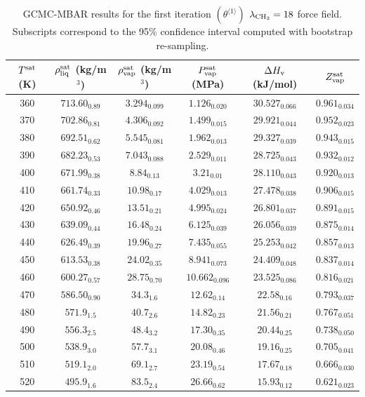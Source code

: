 \documentclass[journal=jctc,manuscript=article]{achemso}
\begin{document}
	\begin{table}[htb!]
		\caption{GCMC-MBAR results for the first iteration $(\theta^{\langle1\rangle})$ $\lambda_{\rm CH_2} = 18$ force field. Subscripts correspond to the 95\% confidence interval computed with bootstrap re-sampling.}
		\begin{center}
			\begin{tabular}{|c|c|c|c|c|c|}
				\hline
				$T^{\rm sat}$ (K) & $\rho_{\rm liq}^{\rm sat}$ (kg/m$^3$) & $\rho_{\rm vap}^{\rm sat}$ (kg/m$^3$) & $P_{\rm vap}^{\rm sat}$ (MPa) & $\Delta H_{\rm v}$ (kJ/mol) & $Z_{\rm vap}^{\rm sat}$ \\ \hline
				360 & $713.60_{0.89}$ & $3.294_{0.099}$ & $1.126_{0.020}$ & $30.527_{0.066}$ & $0.961_{0.034}$ \\
				370 & $702.86_{0.81}$ & $4.306_{0.092}$ & $1.499_{0.015}$ & $29.921_{0.044}$ & $0.952_{0.023}$ \\
				380 & $692.51_{0.62}$ & $5.545_{0.081}$ & $1.962_{0.013}$ & $29.327_{0.039}$ & $0.943_{0.015}$ \\
				390 & $682.23_{0.53}$ & $7.043_{0.088}$ & $2.529_{0.011}$ & $28.725_{0.043}$ & $0.932_{0.012}$ \\
				400 & $671.99_{0.38}$ & $8.84_{0.13}$ & $3.21_{0.01}$ & $28.110_{0.043}$ & $0.920_{0.013}$ \\
				410 & $661.74_{0.33}$ & $10.98_{0.17}$ & $4.029_{0.013}$ & $27.478_{0.038}$ & $0.906_{0.015}$ \\
				420 & $650.92_{0.46}$ & $13.51_{0.21}$ & $4.995_{0.024}$ & $26.801_{0.037}$ & $0.891_{0.015}$ \\
				430 & $639.09_{0.44}$ & $16.48_{0.24}$ & $6.125_{0.039}$ & $26.056_{0.039}$ & $0.875_{0.014}$ \\
				440 & $626.49_{0.39}$ & $19.96_{0.27}$ & $7.435_{0.055}$ & $25.253_{0.042}$ & $0.857_{0.013}$ \\
				450 & $613.53_{0.38}$ & $24.02_{0.35}$ & $8.941_{0.073}$ & $24.409_{0.048}$ & $0.837_{0.014}$ \\
				460 & $600.27_{0.57}$ & $28.75_{0.70}$ & $10.662_{0.096}$ & $23.525_{0.086}$ & $0.816_{0.021}$ \\
				470 & $586.50_{0.90}$ & $34.3_{1.6}$ & $12.62_{0.14}$ & $22.58_{0.16}$ & $0.793_{0.037}$ \\
				480 & $571.9_{1.5}$ & $40.7_{2.6}$ & $14.82_{0.23}$ & $21.56_{0.21}$ & $0.767_{0.051}$ \\
				490 & $556.3_{2.5}$ & $48.4_{3.2}$ & $17.30_{0.35}$ & $20.44_{0.25}$ & $0.738_{0.050}$ \\
				500 & $538.9_{3.0}$ & $57.7_{3.1}$ & $20.08_{0.46}$ & $19.16_{0.25}$ & $0.705_{0.041}$ \\
				510 & $519.1_{2.0}$ & $69.1_{2.7}$ & $23.19_{0.54}$ & $17.67_{0.18}$ & $0.666_{0.030}$ \\
				520 & $495.9_{1.6}$ & $83.5_{2.4}$ & $26.66_{0.62}$ & $15.93_{0.12}$ & $0.621_{0.023}$ \\
				\hline
			\end{tabular}
		\end{center}
	\end{table}
\end{document}
